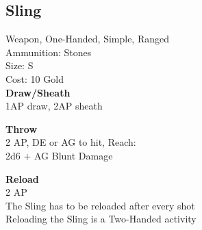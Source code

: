 \subsection{Sling}\label{weapon:sling}
Weapon, One-Handed, Simple, Ranged\\
Ammunition: Stones\\
Size: S\\
Cost: 10 Gold\\

\textbf{Draw/Sheath}\\
1AP draw, 2AP sheath

\textbf{Throw}\\
2 AP, DE or AG to hit,  Reach:\\
2d6 + \texttimes AG Blunt Damage

\textbf{Reload}\\
2 AP\\
The Sling has to be reloaded after every shot\\
Reloading the Sling is a Two-Handed activity
